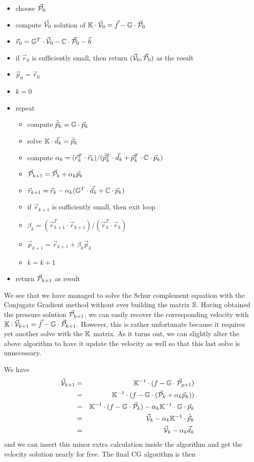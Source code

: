 \begin{itemize}
\item choose $\vec{\cal P}_0$
\item compute $\vec{\cal V}_0$ solution of ${\mathbb{K}}\cdot \vec{\cal V}_0 =\vec{f}- {\mathbb{G}}\cdot \vec{\cal P}_0$ 
\item $\vec{r}_0 = {\mathbb{G}}^T\cdot \vec{\cal V}_0 - {\mathbb{C}} \cdot \vec{\cal P}_0 - \vec{h}$ 
\item if $\vec{r}_0$ is sufficiently small, then return $(\vec{\cal V}_0,\vec{\cal P}_0)$ as the result
\item $\vec{p}_0=\vec{r}_0$
\item $k=0$
\item repeat
\begin{itemize}
\item compute $\tilde{\vec{p}}_k = {\mathbb{G}}\cdot \vec{p}_k$
\item solve ${\mathbb{K}}\cdot  \vec{d}_k = \tilde{\vec{p}}_k$
\item compute $\alpha_k=(\vec{r}_k^T \cdot  \vec{r}_k)/
              (\tilde{\vec{p}}_k^T\cdot \vec{d}_k + \vec{p}_k^T\cdot {\mathbb{C}}\cdot\vec{p}_k)$
\item $\vec{\cal P}_{k+1} = \vec{\cal P}_k+\alpha_k \vec{p}_k$
\item $\vec{r}_{k+1} = \vec{r}_k - \alpha_k ({\mathbb{G}}^T \cdot \vec{d}_k + {\mathbb{C}} \cdot \vec{p}_k) $
\item if $\vec{r}_{k+1}$ is sufficiently small, then exit loop
\item $\beta_k=(\vec{r}_{k+1}^T \cdot \vec{r}_{k+1})/(\vec{r}_k^T \cdot \vec{r}_k)$
\item $\vec{p}_{k+1} =\vec{r}_{k+1}+ \beta_k \vec{p}_k$
\item $k=k+1$
\end{itemize}
\item return $\vec{\cal P}_{k+1}$ as result
\end{itemize}
We see that we have managed to solve the Schur complement equation with the Conjugate Gradient method
without ever building the matrix ${\mathbb{S}}$. Having obtained the pressure solution $\vec{\cal P}_{k+1}$, 
we can easily recover 
the corresponding velocity with ${\mathbb{K}}\cdot \vec{\cal V}_{k+1} =\vec{f}- {\mathbb{G}}\cdot \vec{\cal P}_{k+1}$. 
However, this is rather unfortunate because it requires yet another solve with the ${\mathbb{K}}$ matrix. 
As it turns out, we can slightly alter the above algorithm to have it update the velocity 
as well so that this last solve is unnecessary.

We have 
\begin{eqnarray}
\vec{\cal V}_{k+1} 
&=& {\mathbb{K}}^{-1}\cdot (f - {\mathbb{G}}\cdot \vec{\cal P}_{p+1} )\\
&=& {\mathbb{K}}^{-1}\cdot (f - {\mathbb{G}}\cdot (\vec{\cal P}_k+\alpha_k \vec{p}_k) ) \\
&=& {\mathbb{K}}^{-1}\cdot (f - {\mathbb{G}}\cdot \vec{\cal P}_k) - \alpha_k {\mathbb{K}}^{-1}\cdot {\mathbb{G}} \cdot \vec{p}_k \\
&=& \vec{\cal V}_k - \alpha_k {\mathbb{K}}^{-1}\cdot \tilde{\vec{p}}_k  \\
&=& \vec{\cal V}_k - \alpha_k \vec{d}_k 
\end{eqnarray}
and we can insert this minor extra calculation inside the algorithm and get the velocity solution 
nearly for free. The final CG algorithm is then 

